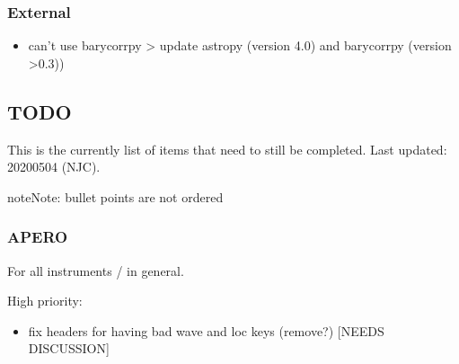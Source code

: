 \documentclass[a4paper,10pt,english]{report}
\begin{document}
\subsubsection{External}
\label{\detokenize{user/general/known_issues:external}}\begin{itemize}
\item {} 
can’t use barycorrpy \textendash{}\textgreater{} update astropy (version 4.0) and barycorrpy (version \textgreater{}0.3))

\end{itemize}


\subsection{TODO}
\label{\detokenize{user/general/todo:todo}}\label{\detokenize{user/general/todo:id1}}\label{\detokenize{user/general/todo::doc}}
This is the currently list of items that need to still be completed.
Last updated: 2020\sphinxhyphen{}05\sphinxhyphen{}04 (NJC).

\begin{sphinxadmonition}{note}{Note:}
bullet points are not ordered
\end{sphinxadmonition}


\subsubsection{APERO}
\label{\detokenize{user/general/todo:apero}}
For all instruments / in general.

High priority:
\begin{itemize}
\item {} 
fix headers for having bad wave and loc keys (remove?) {[}NEEDS DISCUSSION{]}

\end{itemize}
\end{document}
